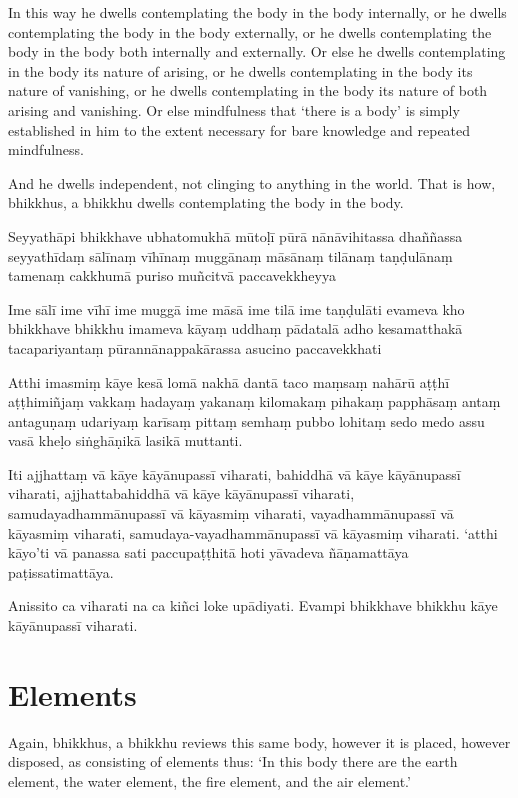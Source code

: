 In this way he dwells contemplating the body in the body internally, or he
dwells contemplating the body in the body externally, or he dwells contemplating
the body in the body both internally and externally. Or else he dwells
contemplating in the body its nature of arising, or he dwells contemplating in
the body its nature of vanishing, or he dwells contemplating in the body its
nature of both arising and vanishing. Or else mindfulness that ‘there is a body’
is simply established in him to the extent necessary for bare knowledge and
repeated mindfulness.

And he dwells independent, not clinging to anything in the world. That is how,
bhikkhus, a bhikkhu dwells contemplating the body in the body.


\paliPage

Seyyathāpi bhikkhave ubhatomukhā mūtoḷī pūrā nānāvihitassa dhaññassa seyyathīdaṃ
sālīnaṃ vīhīnaṃ muggānaṃ māsānaṃ tilānaṃ taṇḍulānaṃ tamenaṃ cakkhumā puriso
muñcitvā paccavekkheyya

Ime sālī ime vīhī ime muggā ime māsā ime tilā ime taṇḍulāti evameva kho
bhikkhave bhikkhu imameva kāyaṃ uddhaṃ pādatalā adho kesamatthakā tacapariyantaṃ
pūrannānappakārassa asucino paccavekkhati

Atthi imasmiṃ kāye kesā lomā nakhā dantā taco maṃsaṃ nahārū aṭṭhī aṭṭhimiñjaṃ
vakkaṃ hadayaṃ yakanaṃ kilomakaṃ pihakaṃ papphāsaṃ antaṃ antaguṇaṃ udariyaṃ
karīsaṃ pittaṃ semhaṃ pubbo lohitaṃ sedo medo assu vasā kheḷo siṅghāṇikā lasikā
muttanti.

Iti ajjhattaṃ vā kāye kāyānupassī viharati, bahiddhā vā kāye kāyānupassī
viharati, ajjhattabahiddhā vā kāye kāyānupassī viharati, samudayadhammānupassī
vā kāyasmiṃ viharati, vayadhammānupassī vā kāyasmiṃ viharati,
samudaya-vayadhammānupassī vā kāyasmiṃ viharati. `atthi kāyo'ti vā panassa sati
paccupaṭṭhitā hoti yāvadeva ñāṇamattāya paṭissatimattāya.

Anissito ca viharati na ca kiñci loke upādiyati. Evampi bhikkhave bhikkhu kāye
kāyānupassī viharati.


\englishPage
\section{Elements}

Again, bhikkhus, a bhikkhu reviews this same body, however it is placed, however
disposed, as consisting of elements thus: `In this body there are the earth
element, the water element, the fire element, and the air element.'

